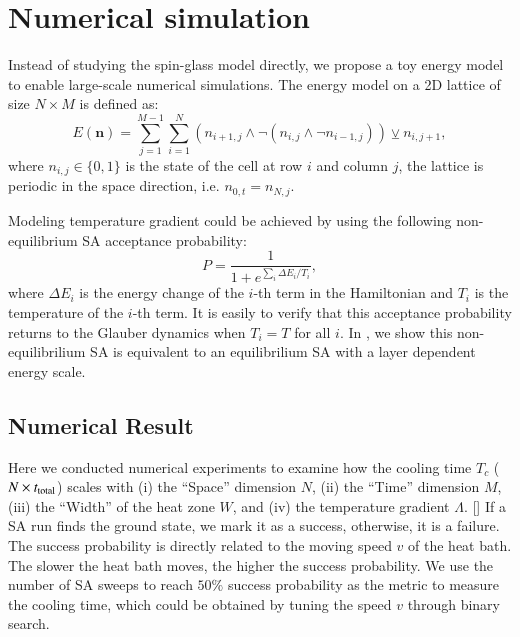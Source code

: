 \documentclass[twocolumn,superscriptaddress,english,showpacs,longbibliography]{revtex4-2}
\newcommand{\ym}[1]{[{\color{red}{YM: #1}}]}
\newcommand{\vn}{{\mathbf{n}}}
\begin{document}
\iffalse
\section{Numerical simulation}\label{sec:numerical-result}
Instead of studying the spin-glass model directly, we propose a toy energy model to enable large-scale numerical simulations.
The energy model on a 2D lattice of size $N \times M$ is defined as:
\begin{equation}\label{eq:toy-hamiltonian}
E(\vn) = \sum_{j=1}^{M-1}\sum_{i=1}^{N} (n_{i+1, j} \land \neg(n_{i, j} \land \neg n_{i-1, j})) \veebar n_{i,j+1},
\end{equation}
where $n_{i, j} \in \{0, 1\}$ is the state of the cell at row $i$ and column $j$, the lattice is periodic in the space direction, i.e. $n_{0, t} = n_{N, j}$.

Modeling temperature gradient could be achieved by using the following non-equilibrium SA acceptance probability:
\begin{equation}
    \label{eq:non-equilibrium-SA}
P = \frac{1}{1 + e^{\sum_i \Delta E_i/ T_i}},
\end{equation}
where $\Delta E_i$ is the energy change of the $i$-th term in the Hamiltonian and $T_i$ is the temperature of the $i$-th term.
It is easily to verify that this acceptance probability returns to the Glauber dynamics when $T_i = T$ for all $i$.
In , we show this non-equilibrilium SA is equivalent to an equilibrilium SA with a layer dependent energy scale.


\subsection{Numerical Result}
Here we conducted numerical experiments to examine how the cooling time $T_{c}$ ($N \times t_{\rm total}$) scales with (i)
the ``Space'' dimension $N$, (ii) the ``Time'' dimension $M$, (iii) the ``Width'' of the heat zone $W$, and (iv) the temperature gradient $\Lambda$.
\ym{I have not conducted experiments for (iii) and (iv).}
If a SA run finds the ground state, we mark it as a success, otherwise, it is a failure.
The success probability is directly related to the moving speed $v$ of the heat bath.
The slower the heat bath moves, the higher the success probability.
We use the number of SA sweeps to reach $50\%$ success probability as the metric to measure the cooling time, which could be obtained by tuning the speed $v$ through binary search.
\end{document}
